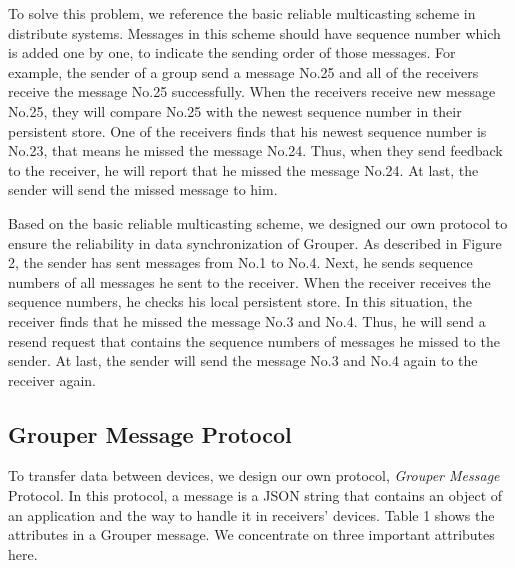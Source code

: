 \documentclass[twocolumn,10pt]{article}
\begin{document}
To solve this problem, we reference the basic reliable multicasting scheme in distribute systems. 
Messages in this scheme should have sequence number which is added one by one, to indicate the sending order of those messages. 
For example, the sender of a group send a message No.25 and all of the receivers receive the message No.25 successfully. 
When the receivers receive new message No.25, they will compare No.25 with the newest sequence number in their persistent store. 
One of the receivers finds that his newest sequence number is No.23, that means he missed the message No.24. 
Thus, when they send feedback to the receiver, he will report that he missed the message No.24. 
At last, the sender will send the missed message to him.

Based on the basic reliable multicasting scheme, we designed our own protocol to ensure the reliability in data synchronization of Grouper. 
As described in Figure 2, the sender has sent messages from No.1 to No.4. 
Next, he sends sequence numbers of all messages he sent to the receiver. 
When the receiver receives the sequence numbers, he checks his local persistent store. 
In this situation, the receiver finds that he missed the message No.3 and No.4. 
Thus, he will send a resend request that contains the sequence numbers of messages he missed to the sender. 
At last, the sender will send the message No.3 and No.4 again to the receiver again.

\subsection{Grouper Message Protocol}

To transfer data between devices, we design our own protocol, \emph{Grouper Message} Protocol. 
In this protocol, a message is a JSON string that contains an object of an application and the way to handle it in receivers’ devices.
Table 1 shows the attributes in a Grouper message.
We concentrate on three important attributes here.
\end{document}
